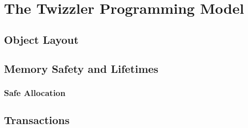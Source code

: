 
\chapter{The Twizzler Programming Model}\label{ch:prog}

\section{Object Layout}

\section{Memory Safety and Lifetimes}

\subsection{Safe Allocation}

\section{Transactions}

